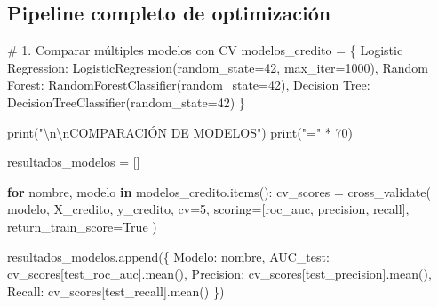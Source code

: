 \documentclass[
  doc,
  floatsintext,
  longtable,
  a4paper,
  nolmodern,
  notxfonts,
  notimes,
  12pt,
  colorlinks=true,linkcolor=blue,citecolor=blue,urlcolor=blue]{apa7}
\newenvironment{Shaded}{\begin{snugshade}}{\end{snugshade}}
\newcommand{\BuiltInTok}[1]{\textcolor[rgb]{0.00,0.23,0.31}{#1}}
\newcommand{\CharTok}[1]{\textcolor[rgb]{0.13,0.47,0.30}{#1}}
\newcommand{\CommentTok}[1]{\textcolor[rgb]{0.37,0.37,0.37}{#1}}
\newcommand{\ControlFlowTok}[1]{\textcolor[rgb]{0.00,0.23,0.31}{\textbf{#1}}}
\newcommand{\DecValTok}[1]{\textcolor[rgb]{0.68,0.00,0.00}{#1}}
\newcommand{\KeywordTok}[1]{\textcolor[rgb]{0.00,0.23,0.31}{\textbf{#1}}}
\newcommand{\NormalTok}[1]{\textcolor[rgb]{0.00,0.23,0.31}{#1}}
\newcommand{\OperatorTok}[1]{\textcolor[rgb]{0.37,0.37,0.37}{#1}}
\newcommand{\StringTok}[1]{\textcolor[rgb]{0.13,0.47,0.30}{#1}}
\newcommand{\VariableTok}[1]{\textcolor[rgb]{0.07,0.07,0.07}{#1}}
\begin{document}
\subsection{Pipeline completo de
optimización}\label{pipeline-completo-de-optimizaciuxf3n}

\begin{Shaded}
\begin{Highlighting}[]
\CommentTok{\# 1. Comparar múltiples modelos con CV}
\NormalTok{modelos\_credito }\OperatorTok{=}\NormalTok{ \{}
    \StringTok{\textquotesingle{}Logistic Regression\textquotesingle{}}\NormalTok{: LogisticRegression(random\_state}\OperatorTok{=}\DecValTok{42}\NormalTok{, max\_iter}\OperatorTok{=}\DecValTok{1000}\NormalTok{),}
    \StringTok{\textquotesingle{}Random Forest\textquotesingle{}}\NormalTok{: RandomForestClassifier(random\_state}\OperatorTok{=}\DecValTok{42}\NormalTok{),}
    \StringTok{\textquotesingle{}Decision Tree\textquotesingle{}}\NormalTok{: DecisionTreeClassifier(random\_state}\OperatorTok{=}\DecValTok{42}\NormalTok{)}
\NormalTok{\}}

\BuiltInTok{print}\NormalTok{(}\StringTok{"}\CharTok{\textbackslash{}n\textbackslash{}n}\StringTok{COMPARACIÓN DE MODELOS"}\NormalTok{)}
\BuiltInTok{print}\NormalTok{(}\StringTok{"="} \OperatorTok{*} \DecValTok{70}\NormalTok{)}

\NormalTok{resultados\_modelos }\OperatorTok{=}\NormalTok{ []}

\ControlFlowTok{for}\NormalTok{ nombre, modelo }\KeywordTok{in}\NormalTok{ modelos\_credito.items():}
\NormalTok{    cv\_scores }\OperatorTok{=}\NormalTok{ cross\_validate(}
\NormalTok{        modelo, X\_credito, y\_credito,}
\NormalTok{        cv}\OperatorTok{=}\DecValTok{5}\NormalTok{,}
\NormalTok{        scoring}\OperatorTok{=}\NormalTok{[}\StringTok{\textquotesingle{}roc\_auc\textquotesingle{}}\NormalTok{, }\StringTok{\textquotesingle{}precision\textquotesingle{}}\NormalTok{, }\StringTok{\textquotesingle{}recall\textquotesingle{}}\NormalTok{],}
\NormalTok{        return\_train\_score}\OperatorTok{=}\VariableTok{True}
\NormalTok{    )}
    
\NormalTok{    resultados\_modelos.append(\{}
        \StringTok{\textquotesingle{}Modelo\textquotesingle{}}\NormalTok{: nombre,}
        \StringTok{\textquotesingle{}AUC\_test\textquotesingle{}}\NormalTok{: cv\_scores[}\StringTok{\textquotesingle{}test\_roc\_auc\textquotesingle{}}\NormalTok{].mean(),}
        \StringTok{\textquotesingle{}Precision\textquotesingle{}}\NormalTok{: cv\_scores[}\StringTok{\textquotesingle{}test\_precision\textquotesingle{}}\NormalTok{].mean(),}
        \StringTok{\textquotesingle{}Recall\textquotesingle{}}\NormalTok{: cv\_scores[}\StringTok{\textquotesingle{}test\_recall\textquotesingle{}}\NormalTok{].mean()}
\NormalTok{    \})}
    

\end{Highlighting}
\end{Shaded}
\end{document}
